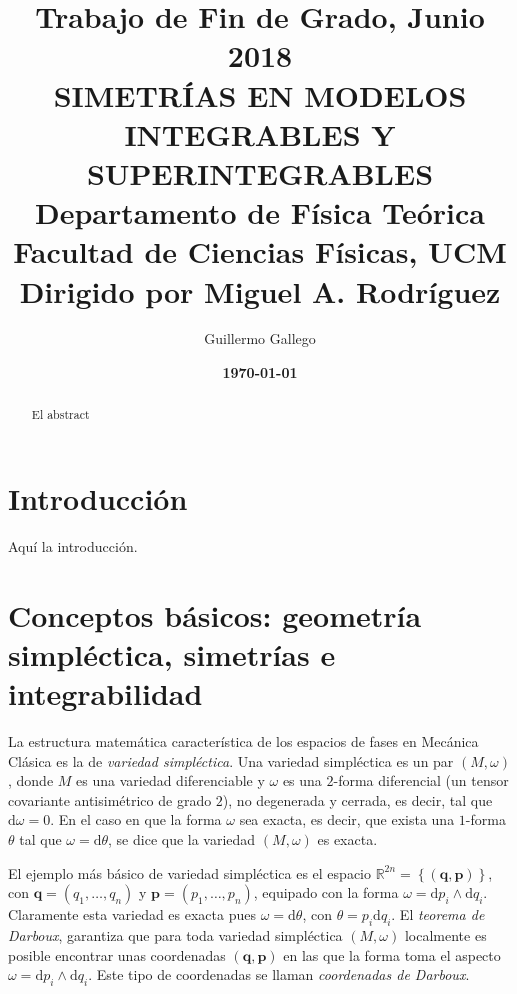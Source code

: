 \documentclass[12pt,a4paper,twocolumn,reqno]{amsart}
\author{Guillermo Gallego}
\date{\bf \today}
\theoremstyle{definition} \newtheorem{defn}[thm]{Definición}
\theoremstyle{definition} \newtheorem{ejemplo}[thm]{Ejemplo}
\theoremstyle{definition} \newtheorem{ejercicio}[thm]{Ejercicio}
\theoremstyle{remark} \newtheorem*{obs}{Observación}
\def\RR{\mathbb{R}}
\def\dd{\mathrm{d}}
\newcommand{\vect}[1]{\mathbf{#1}}
\begin{document}
\onecolumn
\title[SIMETRÍAS EN MODELOS INTEGRABLES Y SUPERINTEGRABLES]{
{\rm\tiny Trabajo  \hspace{-1mm}de  \hspace{-1mm}Fin  \hspace{-1mm}de  \hspace{-1mm}Grado,  
\hspace{-1mm}Junio  \hspace{-1mm}2018}\\[8pt] 
SIMETRÍAS EN MODELOS INTEGRABLES Y SUPERINTEGRABLES\\[8pt]
{\rm\tiny Departamento \hspace{-1mm}de  \hspace{-1mm}Física  \hspace{-1mm}Teórica\\
Facultad  \hspace{-1mm}de  \hspace{-1mm}Ciencias \hspace{-1mm}Físicas,  \hspace{-1mm}UCM\\
{\rm\tiny Dirigido por Miguel A. Rodríguez}
}}
\maketitle
\begin{abstract}
  El abstract
\end{abstract}
\newpage

\twocolumn

\section*{Introducción}
Aquí la introducción.
\section{Conceptos básicos: geometría simpléctica, simetrías e integrabilidad}
La estructura matemática característica de los espacios de fases en Mecánica Clásica es la de \emph{variedad simpléctica}. Una variedad simpléctica es un par $(M,\omega)$, donde $M$ es una variedad diferenciable y $\omega$ es una $2$-forma diferencial (un tensor covariante antisimétrico de grado $2$), no degenerada y cerrada, es decir, tal que $\dd \omega=0$. En el caso en que la forma $\omega$ sea exacta, es decir, que exista una $1$-forma $\theta$ tal que $\omega=\dd \theta$, se dice que la variedad $(M,\omega)$ es exacta. 

El ejemplo más básico de variedad simpléctica es el espacio $\RR^{2n}=\left\{ (\vect{q},\vect{p}) \right\}$, con $\vect{q}=(q_1,\dots,q_n)$ y $\vect{p}=(p_1,\dots,p_n)$, equipado con la forma $\omega=\dd p_i \wedge \dd q_i$. Claramente esta variedad es exacta pues $\omega=\dd \theta$, con $\theta=p_i \dd q_i$. El \emph{teorema de Darboux}, garantiza que para toda variedad simpléctica $(M,\omega)$ localmente es posible encontrar unas coordenadas $(\vect{q},\vect{p})$ en las que la forma toma el aspecto $\omega=\dd p_i \wedge \dd q_i$. Este tipo de coordenadas se llaman \emph{coordenadas de Darboux}.
\end{document}
